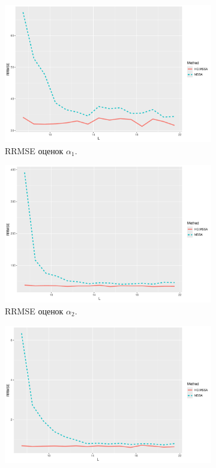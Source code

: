\documentclass[specialist,
  substylefile=spbu.rtx,
subf,href,colorlinks=true, 12pt]{disser}
\theoremstyle{plain}
\theoremstyle{definition}
\theoremstyle{remark}
\begin{document}
\begin{figure}[!ht]
  \centering
  \begin{subfigure}{0.49\linewidth}
    \includegraphics[width=\linewidth]{rate1_L_large_eq_rates.pdf}
    \caption{RRMSE оценок $\alpha_1$.}
    \label{fig:rate1_L_large_eq_rates}
  \end{subfigure}
  \begin{subfigure}{0.49\linewidth}
    \includegraphics[width=\linewidth]{rate2_L_large_eq_rates.pdf}
    \caption{RRMSE оценок $\alpha_2$.}
    \label{fig:rate2_L_large_eq_rates}
  \end{subfigure}
  \begin{subfigure}{0.49\linewidth}
    \includegraphics[width=\linewidth]{freq1_L_large_eq_rates.pdf}

\end{subfigure}
\end{figure}
\end{document}
